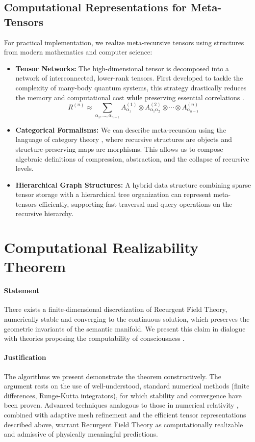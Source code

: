 \subsection{Computational Representations for Meta-Tensors}
For practical implementation, we realize meta-recursive tensors using structures from modern mathematics and computer science:
\begin{itemize}
    \item \textbf{Tensor Networks:} The high-dimensional tensor is decomposed into a network of interconnected, lower-rank tensors. First developed to tackle the complexity of many-body quantum systems, this strategy drastically reduces the memory and computational cost while preserving essential correlations \autocite{Orus2014}.
    \begin{equation}
    R^{(n)} \approx \sum_{\alpha_1, \ldots, \alpha_{n-1}} A^{(1)}_{\alpha_1} \otimes A^{(2)}_{\alpha_1 \alpha_2} \otimes \cdots \otimes A^{(n)}_{\alpha_{n-1}}
    \end{equation}
    \item \textbf{Categorical Formalisms:} We can describe meta-recursion using the language of category theory \autocite{MacLane1998}, where recursive structures are objects and structure-preserving maps are morphisms. This allows us to compose algebraic definitions of compression, abstraction, and the collapse of recursive levels.
    \item \textbf{Hierarchical Graph Structures:} A hybrid data structure combining sparse tensor storage with a hierarchical tree organization can represent meta-tensors efficiently, supporting fast traversal and query operations on the recursive hierarchy.
\end{itemize}

\section{Computational Realizability Theorem}

\paragraph{Statement}
There exists a finite-dimensional discretization of Recurgent Field Theory, numerically stable and converging to the continuous solution, which preserves the geometric invariants of the semantic manifold. We present this claim in dialogue with theories proposing the computability of consciousness \autocite{KochConsciousness2019}.

\paragraph{Justification}
The algorithms we present demonstrate the theorem constructively. The argument rests on the use of well-understood, standard numerical methods (finite differences, Runge-Kutta integrators), for which stability and convergence have been proven. Advanced techniques analogous to those in numerical relativity \autocite{BaumgarteShapiro2010}, combined with adaptive mesh refinement and the efficient tensor representations described above, warrant Recurgent Field Theory as computationally realizable and admissive of physically meaningful predictions. 